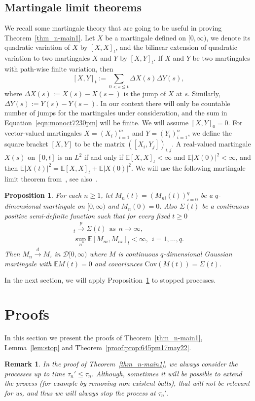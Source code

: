 \documentclass[11pt]{article}
\newtheorem{remark}[theorem]{Remark}
\newtheorem{proposition}[theorem]{Proposition}
\def\EE{\mathbb{E}}
\def\tod{\stackrel{d}{\longrightarrow}}
\def\top{\stackrel{p}{\longrightarrow}}
\newcommand{\cD}{\mathcal{D}}
\def\tod{\stackrel{d}{\longrightarrow}}
\def\top{\stackrel{p}{\longrightarrow}}
\begin{document}
\subsection{Martingale limit theorems}
We recall some martingale theory that are going to be useful in proving Theorem~\ref{thm_n-main1}. Let $X$ be a martingale defined on $[0,\infty)$, we denote its quadratic variation of $X$ by $[X,X]_t$, and the bilinear extension of quadratic variation to two martingales $X$ and $Y$ by $[X,Y]_t$. If $X$ and $Y$ be two martingales with path-wise finite variation, then 
\begin{equation}\label{eqn:monoct7230pm}
[X,Y]_t :=\sum_{0<s\leq t}{ \Delta X(s)\Delta Y(s)},
\end{equation}
where $\Delta X(s):= X(s) -X(s-)$ is the jump of $X$ at $s$. Similarly, $\Delta Y(s):= Y(s) -Y(s-)$. In our context there will only be countable number of jumps for the martingales under consideration, and  the sum in Equation~\eqref{eqn:monoct7230pm} will be finite. We will assume $[X,Y]_0 = 0$. For vector-valued martingales $X = (X_i)_{i=1}^m$ and $Y = (Y_i)_{i=1}^n$, we define the square bracket $[X,Y]$ to be the matrix $([X_i,Y_j])_{i,j}$. A real-valued martingale $X(s)$ on $[0, t]$ is an $L^2$ if and only if
$\mathbb{E}[X,X]_t <\infty$ and $\mathbb{E}|X(0)|^2 <\infty$, and then $\mathbb{E}|X(t)|^2 = \mathbb{E}[X,X]_t+\mathbb{E}|X(0)|^2$. We will use the following martingale limit theorem from~\cite{jacod2013limit}, see also~\cite[Proposition 4.1]{janson2008asymptotic}.
\begin{proposition}\label{prop:martingale}
For each $n\geq 1$, let $M_{n}(t)=(M_{ni}(t))_{i=0}^q$ be a $q$-dimensional martingale on $[0,\infty)$ and $M_n(0)=0$. Also $\Sigma(t)$ be a continuous positive semi-definite function such that for every fixed $t\geq 0$
\begin{align*}
[M_n,M_n]_t \top \Sigma(t)  \ \ \text{as} \ \ n\to \infty, \\
\sup_{n}\EE[M_{ni},M_{ni}]_t<\infty, \ \ i=1,\dots, q.
\end{align*}
Then $M_n\tod M$, in $\cD[0,\infty)$ where $M$ is continuous $q$-dimensional Gaussian martingale with $\mathbb{E} M(t)=0$ and covariances 
$\mathrm{Cov}(M(t))= \Sigma(t)$.
\end{proposition}

In the next section, we will apply Proposition~\ref{prop:martingale} to stopped processes.

\section{Proofs}\label{sec:proof}
In this section we present the proofs of Theorem~\ref{thm_n-main1}, Lemma~\ref{lem:stop} and Theorem~\ref{proof:prop:645pm17may22}.
\begin{remark}
In the proof of Theorem~\ref{thm_n-main1}, we always consider the processes up to time $\tau_n'\leq \tau_n$. Although, sometimes it will be possible to extend the process (for example by removing non-existent balls), that will not be relevant for us, and thus we will always stop the process at $\tau_n'$.%
\end{remark}
\end{document}
